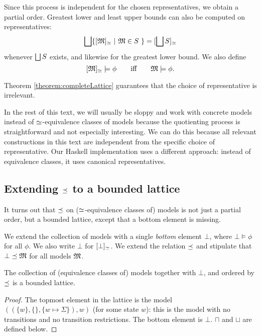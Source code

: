 \NI Since this process is independent for the chosen representatives,
we obtain a partial order. Greatest lower and least upper bounds can also
be computed on representatives:
\[
   \bigsqcup \{[\frak{M}]_{\simeq} \ |\ \frak{M} \in S\ \} = [\bigsqcup S]_{\simeq}
\]
whenever $\bigsqcup S$ exists, and likewise for the greatest lower bound.
We also define 
\[
   [\frak{M}]_{\simeq} \models \phi 
      \qquad\text{iff}\qquad
   \frak{M} \models \phi.
\]

\NI Theorem \ref{theorem:completeLattice} guarantees that the choice
of representative is irrelevant.

In the rest of this text, we will usually be sloppy and work with
concrete models instead of $\simeq$-equivalence classes of models
because the quotienting process is straightforward and not especially
interesting. We can do this because all relevant constructions in this
text are independent from the specific choice of representative.  Our
Haskell implementation \cite{HaskellImplementation} uses a different
approach: instead of equivalence classes, it uses canonical
representatives. 

\subsection{Extending $\preceq$ to a bounded lattice}
\label{boundedlattice}
It turns out that $\preceq $ on ($\simeq$-equivalence classes of)
models is not just a partial order, but a bounded lattice, except
that a bottom element is missing.

\begin{definition}
We extend the collection of models with a single \emph{bottom} element
$\bot$, where $\bot \models \phi$ for all $\phi$. We also write $\bot$
for $[\bot]_{\simeq}$.  We extend the relation $\preceq $ and
stipulate that $\bot \preceq \frak{M}$ for all models $\frak{M}$.
\end{definition}

\begin{theorem}
The collection of (equivalence classes of) models together with
$\bot$, and ordered by $\preceq$ is a bounded lattice.
\end{theorem}
\begin{proof}
The topmost element in the
lattice is the model $( (\{w\}, \{\}, \{w \mapsto \Sigma\}), w)$ (for
some state $w$): this is the model with no transitions and no
transition restrictions.
The bottom element is $\bot$. 
$\sqcap$ and $\sqcup$ are defined below.
\end{proof}

